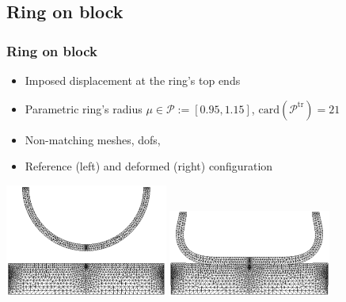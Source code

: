 \subsection{Ring on block}
\begin{frame}\frametitle{Ring on block}
	\begin{itemize}
		\item Imposed displacement at the ring's top ends
		\item Parametric ring's radius $\mu\in\mathcal P:=[0.95,1.15]$,
		$\mathrm{card}(\mathcal P^{\mathrm{tr}})=21$
		\item Non-matching meshes,  dofs, 
		\item Reference (left) and deformed (right) configuration
	\end{itemize}
	\begin{center}
		\includegraphics[width=0.4\textwidth]{./images/contact/ref_mesh.png}\quad
		\includegraphics[width=0.4\textwidth]{./images/contact/def_mesh_1,1.png}
	\end{center}
\end{frame}

